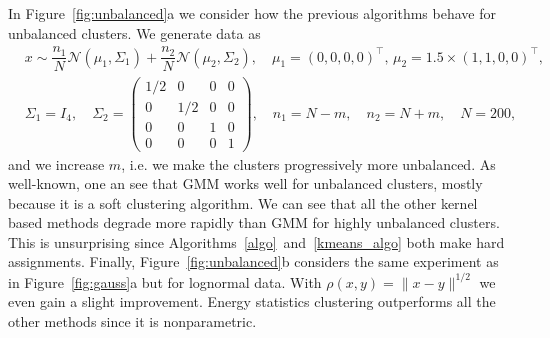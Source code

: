 \documentclass[aps,preprint,nofootinbib,floatfix]{revtex4-1}
\begin{document}
In Figure~\ref{fig:unbalanced}a we consider how the previous algorithms
behave
for unbalanced clusters. We generate data as
\begin{equation}
\label{eq:gauss3}
\begin{split}
&x \sim  
\dfrac{n_1}{N} \mathcal{N}(\mu_1,\Sigma_1) + 
\dfrac{n_2}{N} \mathcal{N}(\mu_2, \Sigma_2), 
\quad \mu_1 = (0,0,0,0)^\top , \,
\mu_2 = 1.5\times (1,1,0,0)^\top, \\
&
\Sigma_1 = I_4, \quad
\Sigma_2 = \left( 
\begin{smallmatrix} 
1/2 & 0 & 0 & 0\\
0 & 1/2 & 0 & 0 \\
0 & 0 & 1 & 0 \\
0 & 0 & 0 & 1 
\end{smallmatrix}\right), \quad
n_1 = N - m, \quad  n_2 = N + m, \quad N=200,
\end{split}
\end{equation}
and we increase $m$, i.e. we make the clusters progressively more unbalanced.
As well-known, one an see that GMM
works well for unbalanced clusters, mostly because 
it is a soft clustering algorithm.
We can see that all the other kernel based methods
degrade more rapidly than GMM for
highly unbalanced clusters.
This is
unsurprising since Algorithms~\ref{algo}~and~\ref{kmeans_algo} both 
make hard assignments. Finally, Figure~\ref{fig:unbalanced}b considers
the same experiment as in Figure~\ref{fig:gauss}a but for lognormal
data. With $\rho(x,y) = \| x-y\|^{1/2}$ we even gain a slight improvement.
Energy statistics clustering outperforms all the other methods since
it is nonparametric.
\end{document}
